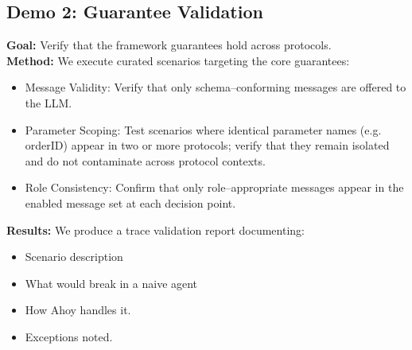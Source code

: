 \documentclass[runningheads]{llncs}
\newcommand{\ahoy}{Ahoy\xspace}
\begin{document}
\subsection{Demo 2: Guarantee Validation}
\textbf{Goal:} Verify that the framework guarantees hold across protocols.\\
\textbf{Method:} We execute curated scenarios targeting the core guarantees:
\begin{itemize}
    \item Message Validity: Verify that only schema--conforming messages are offered to the LLM.
    \item Parameter Scoping: Test scenarios where identical parameter names (e.g. orderID) appear in two or more protocols; verify that they remain isolated and do not contaminate across protocol contexts.
    \item Role Consistency: Confirm that only role--appropriate messages appear in the enabled message set at each decision point.
\end{itemize}
\textbf{Results:} We produce a trace validation report documenting:
\begin{itemize}
    \item Scenario description
    \item What would break in a naive agent
    \item How \ahoy handles it.
    \item Exceptions noted.
\end{itemize}
\end{document}
